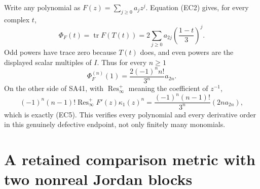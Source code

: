 \documentclass[11pt]{article}
\newcommand{\tr}{\operatorname{tr}}
\newcommand{\Res}{\operatorname{Res}}
\begin{document}
Write any polynomial as \(F(z)=\sum_{j\ge0}a_jz^j\).
Equation (EC2) gives, for every complex \(t\),
\begin{equation}
 \Phi_F(t)=\tr F(T(t))
     =2\sum_{j\ge0}a_{2j}\left(\frac{1-t}{3}\right)^j .
 \tag{EC4}
\end{equation}
Odd powers have trace zero because \(T(t)\) does, and even
powers are the displayed scalar multiples of \(I\).
Thus for every \(n\ge1\)
\begin{equation}
 \Phi_F^{(n)}(1)=\frac{2(-1)^n n!}{3^n}a_{2n}.
 \tag{EC5}
\end{equation}
On the other side of SA41, with \(\Res_\infty^+\) meaning the
coefficient of \(z^{-1}\),
\[
 (-1)^n(n-1)!\Res_\infty^+F'(z)\kappa_1(z)^n
 =\frac{(-1)^n(n-1)!}{3^n}(2n a_{2n}),
\]
which is exactly (EC5). This verifies every polynomial and
every derivative order in this genuinely defective endpoint,
not only finitely many monomials.

\section{A retained comparison metric with two nonreal Jordan blocks}
\end{document}
